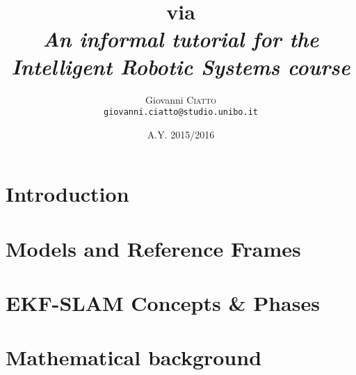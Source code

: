 \documentclass[a4paper,12pt]{article}
\title{
	\textbf{
		\Slam{} via \Ekf{}
	} \\
	{\normalsize\textit{
		An informal tutorial for the \emph{Intelligent Robotic Systems} course
	}}
}
\author{
	Giovanni \textsc{Ciatto} \\ \texttt{giovanni.ciatto@studio.unibo.it} \\
}
\date{A.Y. 2015/2016}
\numberwithin{equation}{section}
\theoremstyle{remark}
\newcommand{\SLAM}{SLAM}
\newcommand{\EKF}{EKF}
\begin{document}
	
	\maketitle
	
	\section{Introduction}
		
		
	\section{Models and Reference Frames}
		
		
	\section{\EKF{}-\SLAM{} Concepts \& Phases}
		
		
	\newpage
	\appendix
	\section{Mathematical background}
		
	
	\newpage
	{}
	
			
\end{document}
